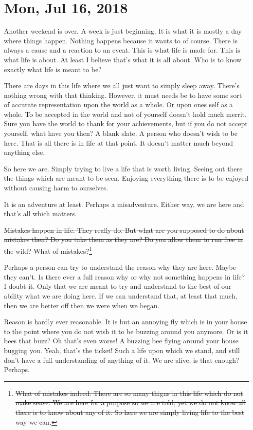 \section{Mon, Jul 16, 2018}

Another weekend is over. A week is just beginning. It is what it is mostly a day
where things happen. Nothing happens because it wants to of course. There is
always a cause and a reaction to an event. This is what life is made for. This
is what life is about. At least I believe that's what it is all about. Who is to
know exactly what life is meant to be?

There are days in this life where we all just want to simply sleep away. There's
nothing wrong with that thinking. However, it must needs be to have some sort of
accurate representation upon the world as a whole. Or upon ones self as a whole.
To be accepted in the world and not of yourself doesn't hold much merrit. Sure
you have the world to thank for your achievements, but if you do not accept
yourself, what have you then? A blank slate. A person who doesn't wish to be
here. That is all there is in life at that point. It  doesn't matter much beyond
anything else.

So here we are. Simply trying to live a life that is worth living. Seeing out
there the things which are meant to be seen. Enjoying everything there is to be
enjoyed without causing harm to ourselves.

It is an adventure at least. Perhaps a misadventure. Either way, we are here and
that's all which matters.

\st{Mistakes happen in life. They really do. But what are you supposed to do
about mistakes then? Do you take them as they are? Do you allow them to run free
in the wild? What of mistakes?}\footnote{\st{What of mistakes indeed. There are so
many thigns in this life which do not make sense. We are here for a purpose
so we are told, yet we do not know all there is to know about any of it. So here
we are simply living life to the best way we can.}}

Perhaps a person can try to understand the reason why they are here. Maybe they
can't. Is there ever a full reason why or why not something happens in life? I
doubt it. Only that we are meant to try and understand to the best of our
ability what we are doing here. If we can understand that, at least that much,
then we are better off then we were when we began.

Reason is hardly ever reasonable. It is but an annoying fly which is in your
house to the point where you do not wish it to be buzzing around you anymore. Or
is it bees that buzz? Oh that's even worse! A buzzing bee flying around your
house bugging you. Yeah, that's the ticket! Such a life upon which we stand, and
still don't have a full understanding of anything of it. We are alive, is that
enough? Perhaps.

